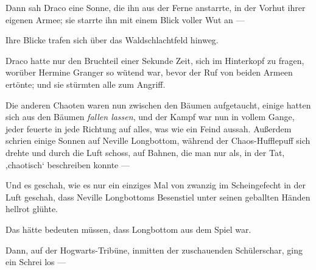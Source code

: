 Dann sah Draco eine Sonne, die ihn aus der Ferne anstarrte, in der Vorhut ihrer eigenen Armee; sie starrte ihn mit einem Blick voller Wut an —

Ihre Blicke trafen sich über das Waldschlachtfeld hinweg.

Draco hatte nur den Bruchteil einer Sekunde Zeit, sich im Hinterkopf zu fragen, worüber Hermine Granger so wütend war, bevor der Ruf von beiden Armeen ertönte; und sie stürmten alle zum Angriff.

\later

Die anderen Chaoten waren nun zwischen den Bäumen aufgetaucht, einige hatten sich aus den Bäumen \emph{fallen lassen}, und der Kampf war nun in vollem Gange, jeder feuerte in jede Richtung auf alles, was wie ein Feind aussah. Außerdem schrien einige Sonnen  auf Neville Longbottom, während der Chaos-Hufflepuff sich drehte und durch die Luft schoss, auf Bahnen, die man nur als, in der Tat, ‚chaotisch‘ beschreiben konnte —

Und es geschah, wie es nur ein einziges Mal von zwanzig im Scheingefecht in der Luft geschah, dass Neville Longbottoms Besenstiel unter seinen geballten Händen hellrot glühte.

Das hätte bedeuten müssen, dass Longbottom aus dem Spiel war.

Dann, auf der Hogwarts-Tribüne, inmitten der zuschauenden Schülerschar, ging ein Schrei los —

